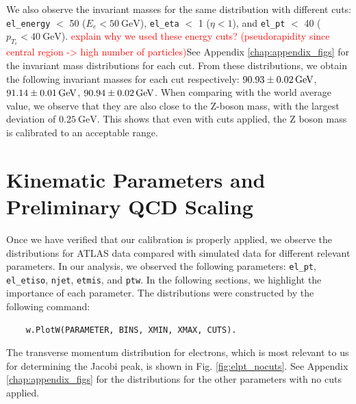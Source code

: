 \documentclass[a4paper]{report}
\numberwithin{equation}{section}
\begin{document}
We also observe the invariant masses for the same distribution with different cuts: \texttt{el\_energy} $<$ 50 ($E_e < \SI{50}{\giga\electronvolt}$), \texttt{el\_eta} $<$ 1 
($\eta < 1$), and \texttt{el\_pt} $<$ 40 ($p_{T_e} < \SI{40}{\giga\electronvolt}$). \textcolor{red}{explain why we used these energy cuts? 
(pseudorapidity since central region -> high number of particles)}See Appendix \ref{chap:appendix_figs} for the 
invariant mass distributions for each cut. From these distributions, we obtain the following invariant masses for each cut 
respectively: 
$\SI{90.93 \pm 0.02}{\giga\electronvolt}$, $\SI{91.14 \pm 0.01}{\giga\electronvolt}$, $\SI{90.94 \pm 0.02}{\giga\electronvolt}$. 
When comparing with the world average value, we observe that they are also close to the Z-boson mass, with the largest deviation 
of $\SI{0.25}{\giga\electronvolt}$. This shows that even with cuts applied, the Z boson mass is calibrated to an acceptable range. 

\section{Kinematic Parameters and Preliminary QCD Scaling}

Once we have verified that our calibration is properly applied, we observe the distributions for ATLAS data compared with 
simulated data for different relevant parameters. In our analysis, we observed the following parameters: 
\texttt{el\_pt}, \texttt{el\_etiso}, \texttt{njet}, \texttt{etmis}, and \texttt{ptw}. In the following sections, we highlight
the importance of each parameter. The distributions were constructed by the following command:
\begin{verbatim}
    w.PlotW(PARAMETER, BINS, XMIN, XMAX, CUTS).
\end{verbatim} 
The transverse momentum distribution for electrons, which is most relevant to us for determining the Jacobi peak, is shown 
in Fig. \ref{fig:elpt_nocuts}. See Appendix \ref{chap:appendix_figs} for the distributions for the other parameters with no cuts applied. \par 
\end{document}
